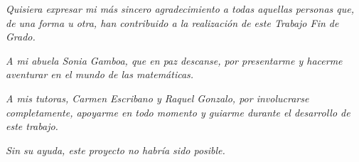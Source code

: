 \thispagestyle{empty}
\begin{flushright}
  \vspace{2cm} %

  \textit{Quisiera expresar mi más sincero agradecimiento a todas aquellas personas que, de una forma u otra, han contribuido a la realización de este Trabajo Fin de Grado.}

  \textit{A mi abuela Sonia Gamboa, que en paz descanse, por presentarme y hacerme aventurar en el mundo de las matemáticas.}

  \textit{A mis tutoras, Carmen Escribano y Raquel Gonzalo, por involucrarse completamente, apoyarme en todo momento y guiarme durante el desarrollo de este trabajo.}

  \textit{Sin su ayuda, este proyecto no habría sido posible.}
\end{flushright}
